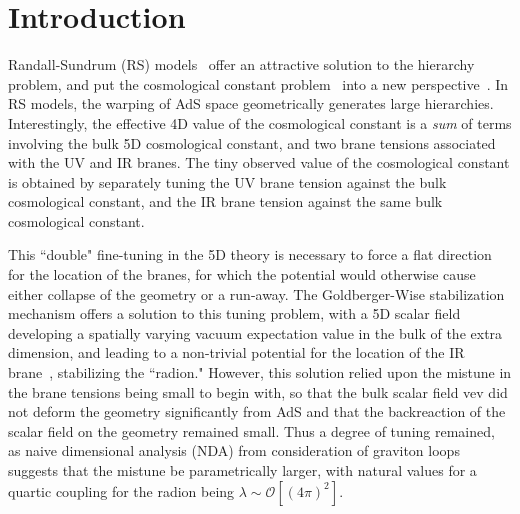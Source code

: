 \documentclass[12pt]{article}
\begin{document}

\setcounter{equation}{0}
\setcounter{footnote}{0}


\section{Introduction}
Randall-Sundrum (RS) models~\cite{Randall:1999ee} offer an attractive solution to the hierarchy problem, and put the cosmological constant problem~\cite{Weinberg:1988cp} into a new perspective~\cite{Rubakov:1983bz,Sundrum:2003yt}.  In RS models, the warping of AdS space geometrically generates large hierarchies.  Interestingly, the effective 4D value of the cosmological constant is a \emph{sum} of terms involving the bulk 5D cosmological constant, and two brane tensions associated with the UV and IR branes.  The tiny observed value of the cosmological constant is obtained by separately tuning the UV brane tension against the bulk cosmological constant, and the IR brane tension against the same bulk cosmological constant.

This ``double" fine-tuning in the 5D theory is necessary to force a flat direction for the location of the branes, for which the potential would otherwise cause either collapse of the geometry or a run-away.  The Goldberger-Wise stabilization mechanism offers a solution to this tuning problem, with a 5D scalar field developing a spatially varying vacuum expectation value in the bulk of the extra dimension, and leading to a non-trivial potential for the location of the IR brane~\cite{Goldberger:1999uk,Goldberger:1999un}, stabilizing the ``radion."  However, this solution relied upon the mistune in the brane tensions being small to begin with, so that the bulk scalar field vev did not deform the geometry significantly from AdS and that the backreaction of the scalar field on the geometry remained small.  Thus a degree of tuning remained, as naive dimensional analysis (NDA) from consideration of graviton loops suggests that the mistune be parametrically larger, with natural values for a  quartic coupling for the radion being $\lambda \sim {\mathcal O}\left[ (4 \pi)^2 \right]$.
\end{document}
